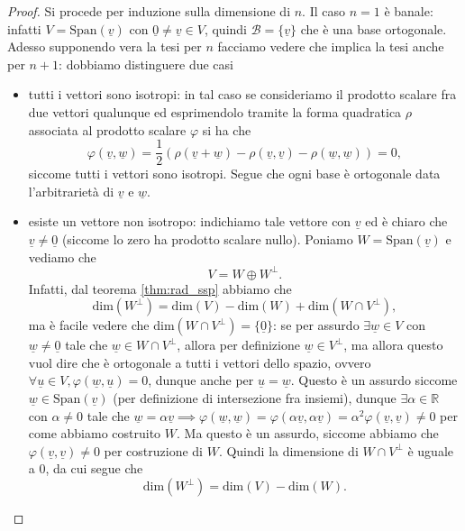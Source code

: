 \begin{proof}
	Si procede per induzione sulla dimensione di $n$. Il caso $n=1$ è banale: infatti $V = \text{Span}(\underline{v})$ con $\underline{0} \neq \underline{v} \in V$, quindi $\mathcal{B} = \{ \underline{v} \}$ che è una base ortogonale. Adesso supponendo vera la tesi per $n$ facciamo vedere che implica la tesi anche per $n+1$: dobbiamo distinguere due casi
	\begin{itemize}
		\item tutti i vettori sono isotropi: in tal caso se consideriamo il prodotto scalare fra due vettori qualunque ed esprimendolo tramite la forma quadratica $\rho$ associata al prodotto scalare $\varphi$ si ha che
		$$
			\varphi(\underline{v}, \underline{w}) = \frac{1}{2}(\rho(\underline{v} + \underline{w}) - \rho(\underline{v}, \underline{v}) - \rho(\underline{w}, \underline{w})) = 0,
		$$
		siccome tutti i vettori sono isotropi. Segue che ogni base è ortogonale data l'arbitrarietà di $\underline{v}$ e $\underline{w}$.
		\item esiste un vettore non isotropo: indichiamo tale vettore con $\underline{v}$ ed è chiaro che $\underline{v} \neq \underline{0}$ (siccome lo zero ha prodotto scalare nullo). Poniamo $W = \text{Span}(\underline{v})$ e vediamo che
		$$
			V = W \oplus W^\perp.
		$$
		Infatti, dal teorema \ref{thm:rad_ssp} abbiamo che 
		$$
			\text{dim}(W^\perp) = \text{dim}(V) - \text{dim}(W) + \text{dim}(W \cap V^\perp),
		$$
		ma è facile vedere che $\text{dim}(W \cap V^\perp) = \{\underline{0} \}$: se per assurdo $\exists \underline{w} \in V$ con $\underline{w} \neq \underline{0}$ tale che $\underline{w} \in W \cap V^\perp$, allora per definizione $\underline{w} \in V^\perp$, ma allora questo vuol dire che è ortogonale a tutti i vettori dello spazio, ovvero $\forall \underline{u} \in V, \varphi(\underline{w}, \underline{u}) = 0$, dunque anche per $\underline{u} = \underline{w}$. Questo è un assurdo siccome $\underline{w} \in \text{Span}(\underline{v})$ (per definizione di intersezione fra insiemi), dunque $\exists \alpha \in \mathbb{R}$ con $\alpha \neq 0$ tale che $\underline{w} = \alpha \underline{v} \implies \varphi(\underline{w}, \underline{w}) = \varphi(\alpha \underline{v}, \alpha \underline{v}) = \alpha^2 \varphi(\underline{v}, \underline{v}) \neq 0$ per come abbiamo costruito $W$. 
		Ma questo è un assurdo, siccome abbiamo che $\varphi(\underline{v}, \underline{v}) \neq 0$ per costruzione di $W$. Quindi la dimensione di $W \cap V^\perp$ è uguale a $0$, da cui segue che
		$$
			\text{dim}(W^\perp) = \text{dim}(V) - \text{dim}(W).
$$
\end{itemize}
\end{proof}
